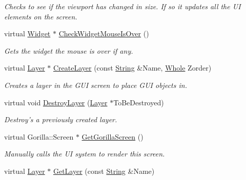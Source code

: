 \begin{DoxyCompactItemize}
\begin{DoxyCompactList}\small\item\em Checks to see if the viewport has changed in size. If so it updates all the UI elements on the screen. \item\end{DoxyCompactList}\item 
virtual \hyperlink{classphys_1_1UI_1_1Widget}{Widget} $\ast$ \hyperlink{classphys_1_1UI_1_1Screen_a4f20df93a4ba43bbd1cd9e58e6174e1d}{CheckWidgetMouseIsOver} ()
\begin{DoxyCompactList}\small\item\em Gets the widget the mouse is over if any. \item\end{DoxyCompactList}\item 
virtual \hyperlink{classphys_1_1UI_1_1Layer}{Layer} $\ast$ \hyperlink{classphys_1_1UI_1_1Screen_ad3b73f039f840fd2b2dc20219c428e9d}{CreateLayer} (const \hyperlink{namespacephys_aa03900411993de7fbfec4789bc1d392e}{String} \&Name, \hyperlink{namespacephys_a460f6bc24c8dd347b05e0366ae34f34a}{Whole} Zorder)
\begin{DoxyCompactList}\small\item\em Creates a layer in the GUI screen to place GUI objects in. \item\end{DoxyCompactList}\item 
virtual void \hyperlink{classphys_1_1UI_1_1Screen_a14b1c36c8d0032a04ec137bfdd6f5122}{DestroyLayer} (\hyperlink{classphys_1_1UI_1_1Layer}{Layer} $\ast$ToBeDestroyed)
\begin{DoxyCompactList}\small\item\em Destroy's a previously created layer. \item\end{DoxyCompactList}\item 
virtual Gorilla::Screen $\ast$ \hyperlink{classphys_1_1UI_1_1Screen_a6ba3a966f2977cc095355c93d5bec81d}{GetGorillaScreen} ()
\begin{DoxyCompactList}\small\item\em Manually calls the UI system to render this screen. \item\end{DoxyCompactList}\item 
virtual \hyperlink{classphys_1_1UI_1_1Layer}{Layer} $\ast$ \hyperlink{classphys_1_1UI_1_1Screen_a4969b2e17fa22706046f5653c91a2e70}{GetLayer} (const \hyperlink{namespacephys_aa03900411993de7fbfec4789bc1d392e}{String} \&Name)

\end{DoxyCompactItemize}
